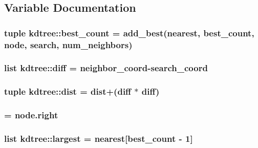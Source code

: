 \subsection{Variable Documentation}
\hypertarget{namespacekdtree_a5254def45bf553b4ed113993acde66ec}{
\subsubsection[{best\_\-count}]{\setlength{\rightskip}{0pt plus 5cm}tuple {\bf kdtree::best\_\-count} = add\_\-best(nearest, {\bf best\_\-count}, node, search, num\_\-neighbors)}}
\label{namespacekdtree_a5254def45bf553b4ed113993acde66ec}
\hypertarget{namespacekdtree_acdecd5b85843a2d9caa9703f3d246c5a}{
\subsubsection[{diff}]{\setlength{\rightskip}{0pt plus 5cm}list {\bf kdtree::diff} = neighbor\_\-coord-\/search\_\-coord}}
\label{namespacekdtree_acdecd5b85843a2d9caa9703f3d246c5a}
\hypertarget{namespacekdtree_ab18cecee0f3d4292dc06665f88c9dcd1}{
\subsubsection[{dist}]{\setlength{\rightskip}{0pt plus 5cm}tuple {\bf kdtree::dist} = {\bf dist}+({\bf diff} $\ast$ {\bf diff})}}
\label{namespacekdtree_ab18cecee0f3d4292dc06665f88c9dcd1}
\hypertarget{namespacekdtree_a1098829259a7546f7778cfe19c86e50c}{
\subsubsection[{far}]{ = node.right}}
\label{namespacekdtree_a1098829259a7546f7778cfe19c86e50c}
\hypertarget{namespacekdtree_a8ae4f604fa3b331f0e1857ef7988dbed}{
\subsubsection[{largest}]{\setlength{\rightskip}{0pt plus 5cm}list {\bf kdtree::largest} = nearest\mbox{[}{\bf best\_\-count} -\/ 1\mbox{]}}}
